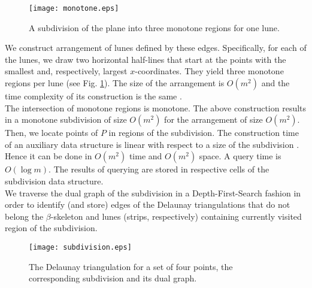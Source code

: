 \documentclass[10pt]{article}
\begin{document}
\begin{figure}[hbt]
\begin{center}
\texttt{[image: monotone.eps]}
\caption{ A subdivision of the plane into three monotone regions for one lune. }
\label{fig:2}
\end{center}
\end{figure}


We construct arrangement of lunes defined by these edges. 
Specifically, for each of the lunes, we draw two horizontal half-lines 
that start at the points with the smallest and, respectively, largest 
$x$-coordinates. They yield three monotone regions per lune (see Fig. \ref{fig:2}).    
The size of the arrangement is $O(m^2)$ 
and the time complexity of its construction is the same \cite{agr00}. \\
The intersection of monotone regions is monotone. The above construction 
results in a monotone subdivision of size $O(m^2)$ for the arrangement of size $O(m^2)$. \\
Then, we locate points of $P$ in regions of the subdivision. The construction time of an auxiliary data structure 
is linear with respect to a size of the subdivision \cite{egs86}.  Hence it can be done in $O(m^2)$ time and $O(m^2)$ 
space. A query time is $O(\log m)$. The results of querying are stored in respective cells of the subdivision 
data structure. \\
We traverse the dual graph of the subdivision in a Depth-First-Search fashion
in order to identify (and store) edges of the Delaunay triangulations that do not belong the $\beta$-skeleton 
and lunes (strips, respectively)
containing currently visited region of the subdivision. \\


\begin{figure}[hbt]
\begin{center}
\texttt{[image: subdivision.eps]}
\caption{ The Delaunay triangulation for a set of four points, the corresponding 
subdivision and its dual graph. }
\label{fig:3}
\end{center}
\end{figure}
\end{document}
